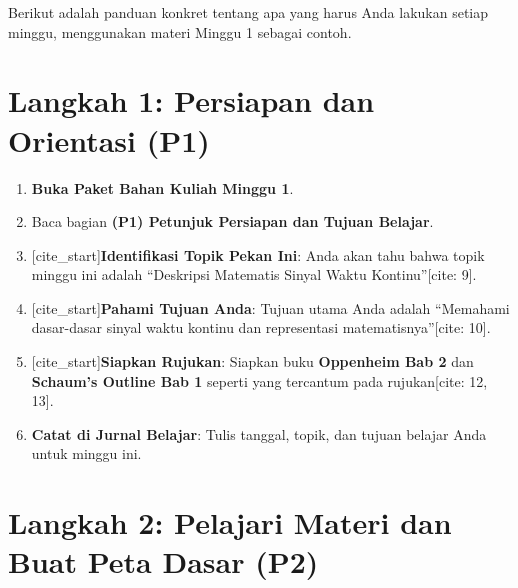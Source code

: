 \documentclass[
  letterpaper,
  DIV=11,
  numbers=noendperiod]{scrreprt}
\providecommand{\tightlist}{%
  \setlength{\itemsep}{0pt}\setlength{\parskip}{0pt}}
\begin{document}

Berikut adalah panduan konkret tentang apa yang harus Anda lakukan
setiap minggu, menggunakan materi Minggu 1 sebagai contoh.

\section*{\texorpdfstring{\textbf{Langkah 1: Persiapan dan Orientasi
(P1)}}{Langkah 1: Persiapan dan Orientasi (P1)}}\label{langkah-1-persiapan-dan-orientasi-p1}


\begin{enumerate}
\def\labelenumi{\arabic{enumi}.}
\tightlist
\item
  \textbf{Buka Paket Bahan Kuliah Minggu 1}.
\item
  Baca bagian \textbf{(P1) Petunjuk Persiapan dan Tujuan Belajar}.
\item
  {[}cite\_start{]}\textbf{Identifikasi Topik Pekan Ini}: Anda akan tahu
  bahwa topik minggu ini adalah ``Deskripsi Matematis Sinyal Waktu
  Kontinu''{[}cite: 9{]}.
\item
  {[}cite\_start{]}\textbf{Pahami Tujuan Anda}: Tujuan utama Anda adalah
  ``Memahami dasar-dasar sinyal waktu kontinu dan representasi
  matematisnya''{[}cite: 10{]}.
\item
  {[}cite\_start{]}\textbf{Siapkan Rujukan}: Siapkan buku
  \textbf{Oppenheim Bab 2} dan \textbf{Schaum's Outline Bab 1} seperti
  yang tercantum pada rujukan{[}cite: 12, 13{]}.
\item
  \textbf{Catat di Jurnal Belajar}: Tulis tanggal, topik, dan tujuan
  belajar Anda untuk minggu ini.
\end{enumerate}

\section*{\texorpdfstring{\textbf{Langkah 2: Pelajari Materi dan Buat
Peta Dasar
(P2)}}{Langkah 2: Pelajari Materi dan Buat Peta Dasar (P2)}}\label{langkah-2-pelajari-materi-dan-buat-peta-dasar-p2}

\end{document}
